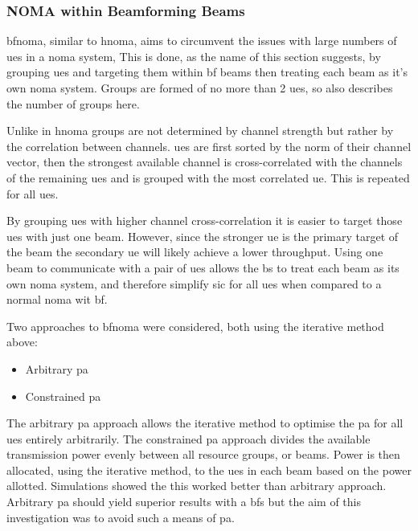 \subsubsection{NOMA within Beamforming Beams}
\acf{bfnoma}, similar to \ac{hnoma}, aims to circumvent the issues with large numbers of \acp{ue} in a \ac{noma} system, 
This is done, as the name of this section suggests, by grouping \acp{ue} and targeting them within \ac{bf} beams then treating each beam as it's own \ac{noma} system.
Groups are formed of no more than 2 \acp{ue}, so  also describes the number of groups here.

\par
Unlike in \ac{hnoma} groups are not determined by channel strength but rather by the correlation between channels.
\acp{ue} are first sorted by the norm of their channel vector, then the strongest available channel is cross-correlated with the channels of the remaining \acp{ue} and is grouped with the most correlated \ac{ue}.
This is repeated for all \acp{ue}.

\par
By grouping \acp{ue} with higher channel cross-correlation it is easier to target those \acp{ue} with just one beam.
However, since the stronger \ac{ue} is the primary target of the beam the secondary \ac{ue} will likely achieve a lower throughput. 
Using one beam to communicate with a pair of \acp{ue} allows the \ac{bs} to treat each beam as its own \ac{noma} system, and therefore simplify \ac{sic} for all \acp{ue} when compared to a normal \ac{noma} wit \ac{bf}.

\par
Two approaches to \ac{bfnoma} were considered, both using the iterative method above:

\begin{itemize}
	\item Arbitrary \ac{pa}
	\item Constrained \ac{pa}
\end{itemize}

\par
The arbitrary \ac{pa} approach allows the iterative method to optimise the \ac{pa} for all \acp{ue} entirely arbitrarily.
The constrained \ac{pa} approach divides the available transmission power evenly between all resource groups, or beams.
Power is then allocated, using the iterative method, to the \acp{ue} in each beam based on the power allotted. 
Simulations showed the this worked better than arbitrary approach.
Arbitrary \ac{pa} should yield superior results with a \ac{bfs} but the aim of this investigation was to avoid such a means of \ac{pa}.

